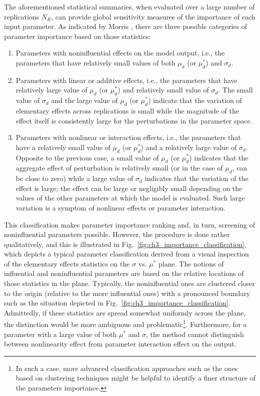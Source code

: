 The aforementioned statistical summaries, when evaluated over a large number of replications $N_R$,
can provide global sensitivity measures of the importance of each input parameter.
As indicated by Morris \cite{Morris1991}, there are three possible categories of parameter importance based on those statistics:
\begin{enumerate}
	\item Parameters with noninfluential effects on the model output, i.e., the parameters that have relatively small values of both $\mu_d$ (or $\mu^*_d$) and $\sigma_d$.
	\item Parameters with linear or additive effects, i.e., the parameters that have relatively large value of $\mu_d$ (or $\mu^*_d$) and relatively small value of $\sigma_d$.
	The small value of $\sigma_d$ and the large value of $\mu_d$ (or $\mu^*_d$) indicate that the variation of elementary effects across replications is small while the magnitude of the effect itself is consistently large for the perturbations in the parameter space.
	\item Parameters with nonlinear or interaction effects, i.e., the parameters that have a relatively small value of $\mu_d$ (or $\mu^*_d$) and a relatively large value of $\sigma_d$.
	Opposite to the previous case, a small value of $\mu_d$ (or $\mu^*_d$) indicates that the aggregate effect of perturbation is relatively small (or in the case of $\mu_d$, can be close to zero) while a large value of $\sigma_d$ indicates that the variation of the effect is large; the effect can be large or negligibly small depending on the values of the other parameters at which the model is evaluated.
	Such large variation is a symptom of nonlinear effects or parameter interaction.
\end{enumerate}

This classification makes parameter importance ranking and, in turn, screening of noninfluential parameters possible.
However, the procedure is done rather qualitatively, and this is illustrated in Fig.~\ref{fig:ch3_importance_classification}, 
which depicts a typical parameter classification derived from a visual inspection of the elementary effects statistics on the $\sigma$ vs. $\mu^*$ plane.
The notions of influential and noninfluential parameters are based on the relative locations of those statistics in the plane.
Typically, the noninfluential ones are clustered closer to the origin (relative to the more influential ones) with a pronounced boundary such as the situation depicted in Fig.~\ref{fig:ch3_importance_classification}. 
Admittedly, if these statistics are spread somewhat uniformly across the plane, 
the distinction would be more ambiguous and problematic\footnote{In such a case, more advanced classification approaches such as the ones based on clustering techniques might be helpful to identify a finer structure of the parameters importance.}.
Furthermore, for a parameter with a large value of both $\mu^*$ and $\sigma$,
the method cannot distinguish between nonlinearity effect from parameter interaction effect on the output.

